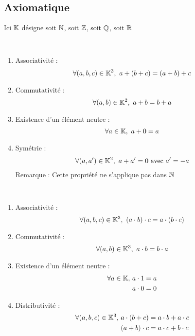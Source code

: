 \subsection{Axiomatique}
Ici $\mathbb{K}$ désigne soit $\mathbb{N}$, soit $\mathbb{Z}$, soit $\mathbb{Q}$, soit $\mathbb{R}$
\begin{proposition}~
	\begin{enumerate}
		\item Associativité :
		\begin{align*}
			\forall(a, b, c) \in \mathbb{K}^3,\ a + (b + c) = (a + b) + c
		\end{align*}
		\item Commutativité :
		\begin{align*}
			\forall(a, b) \in \mathbb{K}^2,\ a + b = b + a
		\end{align*}
		\item Existence d'un élément neutre : 
		\begin{align*}
			\forall a \in \mathbb{K},\ a + 0 = a
		\end{align*}
		\item Symétrie :
		\begin{align*}
			\forall(a, a') \in \mathbb{K}^2,\ a + a' = 0 \textnormal{ avec } a' = -a
		\end{align*}
		Remarque : Cette propriété ne s'applique pas dans $\mathbb{N}$
	\end{enumerate}
\end{proposition}
\clearpage
\begin{proposition}~
	\begin{enumerate}
		\item Associativité :
		\begin{align*}
			\forall (a, b, c) \in \mathbb{K}^3,\ (a \cdot b) \cdot c = a \cdot (b \cdot c)
		\end{align*}
		\item Commutativité :
		\begin{align*}
			\forall (a, b) \in \mathbb{K}^3,\ a \cdot b = b \cdot a
		\end{align*}
		\item Existence d'un élément neutre :
		\begin{align*}
			\forall a \in \mathbb{K}, \ & a \cdot 1 = a \\
			& a \cdot 0 = 0
		\end{align*}
		\item Distributivité : 
		\begin{align*}
			\forall (a, b, c) \in \mathbb{K}^3,\ &a \cdot (b + c) = a \cdot b + a \cdot c \\
			&(a + b) \cdot c = a \cdot c + b \cdot c
		\end{align*}
	\end{enumerate}
\end{proposition}

